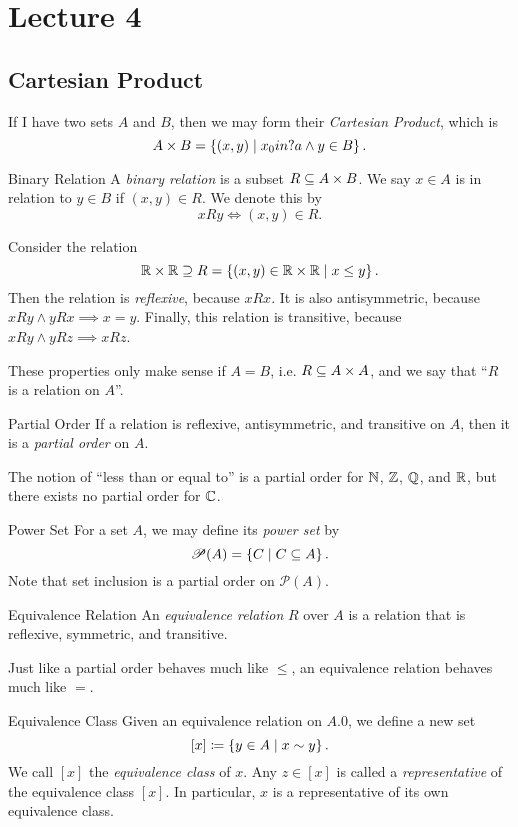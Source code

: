 \documentclass[class=article, crop=false]{standalone}
\begin{document}
  \section{Lecture 4}
  \subsection{Cartesian Product}
  If I have two sets $A$ and $B$, then we may form their \emph{Cartesian Product}, which is
  \[
    A\times B = \left\{(x, y)\mid x_0in ?a\land y\in B\right\}.
  \]
  \begin{definition}{Binary Relation}
    A \emph{binary relation} is a subset $R\subseteq A\times B$. We say $x\in A$ is in relation to $y\in B$ if $(x, y)\in R$. We denote this by
    \[
      xRy\iff (x,y)\in R.
    \]
  \end{definition}
  \begin{example}{}
    Consider the relation 
    \[
      \mathbb{R}\times \mathbb{R}\supseteq R = \left\{(x, y)\in \mathbb{R}\times \mathbb{R}\mid x \leq y\right\}.
    \]
    Then the relation is \emph{reflexive}, because $xRx$. It is also antisymmetric, because $xRy\land yRx\implies x = y$. Finally, this relation is transitive, because $xRy\land yRz\implies xRz$.
  \end{example}
  These properties only make sense if $A = B$, i.e. $R\subseteq A\times A$, and we say that ``$R$ is a relation on $A$''.
  \begin{definition}{Partial Order}
    If a relation is reflexive, antisymmetric, and transitive on $A$, then it is a \emph{partial order} on $A$.
  \end{definition}
  The notion of ``less than or equal to'' is a partial order for $\mathbb{N}$, $\mathbb{Z}$, $\mathbb{Q}$, and $\mathbb{R}$, but there exists no partial order for $\mathbb{C}$.
  \begin{definition}{Power Set}
    For a set $A$, we may define its \emph{power set} by
    \[
      \mathscr{P}(A) = \left\{C\mid C\subseteq A\right\}.
    \]
    Note that set inclusion is a partial order on $\mathscr{P}(A)$.
  \end{definition}
  \begin{definition}{Equivalence Relation}
    An \emph{equivalence relation} $R$ over $A$ is a relation that is reflexive, symmetric, and transitive.
  \end{definition}
  \begin{note}{}
    Just like a partial order behaves much like $\leq$, an equivalence relation behaves much like $=$.
  \end{note}
  \begin{definition}{Equivalence Class}
    Given an equivalence relation on $A$.0, we define a new set
    \[
      [x] \coloneqq \left\{y\in A\mid x\sim y\right\}.
    \]
    We call $[x]$ the \emph{equivalence class} of $x$. Any $z\in [x]$ is called a \emph{representative} of the equivalence class $[x]$. In particular, $x$ is a representative of its own equivalence class.
  \end{definition}
\end{document}
